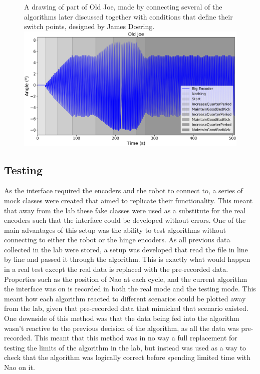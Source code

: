 \documentclass[11pt]{article}
\begin{document}
    \begin{figure}[!htb]
        \centering
        \captionbox
             {A drawing of part of Old Joe, made by connecting several of the algorithms later discussed together with conditions that define their switch points, designed by James Doering.\label{fig:OldJoe}}
             {\includegraphics[width=1.0\textwidth]{OldJoe.eps}}
    \end{figure}

\subsection{Testing}
As the interface required the encoders and the robot to connect to, a series of mock classes were created that aimed to replicate their functionality. This meant that away from the lab these fake classes were used as a substitute for the real encoders such that the interface could be developed without errors.
One of the main advantages of this setup was the ability to test algorithms without connecting to either the robot or the hinge encoders. As all previous data collected in the lab were stored, a setup was developed that read the file in line by line and passed it through the algorithm. This is exactly what would happen in a real test except the real data is replaced with the pre-recorded data.\\
Properties such as the position of Nao at each cycle, and the current algorithm the interface was on is recorded in both the real mode and the testing mode. This meant how each algorithm reacted to different scenarios could be plotted away from the lab, given that pre-recorded data that mimicked that scenario existed.\\
One downside of this method was that the data being fed into the algorithm wasn't reactive to the previous decision of the algorithm, as all the data was pre-recorded. This meant that this method was in no way a full replacement for testing the limits of the algorithm in the lab, but instead was used as a way to check that the algorithm was logically correct before spending limited time with Nao on it.
\end{document}
